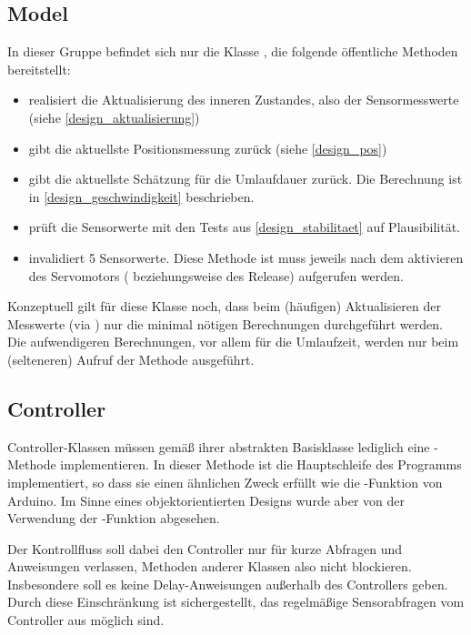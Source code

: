 \subsection{Model}
In dieser Gruppe befindet sich nur die Klasse , die folgende öffentliche Methoden bereitstellt:
\begin{itemize}
	\item {} realisiert die Aktualisierung des inneren Zustandes, also der Sensormesswerte (siehe \cref{design_aktualisierung})
	\item {} gibt die aktuellste Positionsmessung zurück (siehe \cref{design_pos})
	\item {} gibt die aktuellste Schätzung für die Umlaufdauer zurück.
	Die Berechnung ist in \cref{design_geschwindigkeit} beschrieben.
	\item {} prüft die Sensorwerte mit den Tests aus \cref{design_stabilitaet} auf Plausibilität.
	\item {} invalidiert 5 Sensorwerte.
	Diese Methode ist muss jeweils nach dem aktivieren des Servomotors ( beziehungsweise  des Release) aufgerufen werden.
\end{itemize}

Konzeptuell gilt für diese Klasse noch, dass beim (häufigen) Aktualisieren der Messwerte (via ) nur die minimal nötigen Berechnungen durchgeführt werden.
Die aufwendigeren Berechnungen, vor allem für die Umlaufzeit, werden nur beim (selteneren) Aufruf der Methode  ausgeführt.

\subsection{Controller}
Controller-Klassen müssen gemäß ihrer abstrakten Basisklasse  lediglich eine -Methode implementieren.
In dieser Methode ist die Hauptschleife des Programms implementiert, so dass sie einen ähnlichen Zweck erfüllt wie die -Funktion von Arduino.
Im Sinne eines objektorientierten Designs wurde aber von der Verwendung der -Funktion abgesehen.

Der Kontrollfluss soll dabei den Controller nur für kurze Abfragen und Anweisungen verlassen, Methoden anderer Klassen also nicht blockieren.
Insbesondere soll es keine Delay-Anweisungen außerhalb des Controllers geben.
Durch diese Einschränkung ist sichergestellt, das regelmäßige Sensorabfragen vom Controller aus möglich sind.

